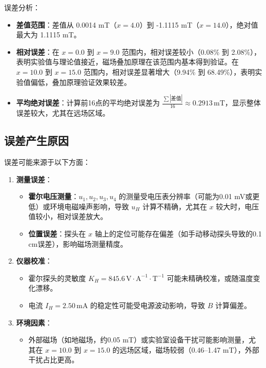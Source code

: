 \documentclass[12pt]{article}
\begin{document}
\begin{CJK}{UTF8}{gbsn}
误差分析：
\begin{itemize}
    \item \textbf{差值范围}：差值从 0.0014 mT（\( x = 4.0 \)）到 -1.1115 mT（\( x = 14.0 \)），绝对值最大为 1.1115 mT。
    \item \textbf{相对误差}：在 \( x = 0.0 \) 到 \( x = 9.0 \) 范围内，相对误差较小（0.08\% 到 2.08\%），表明实验值与理论值接近，磁场叠加原理在该范围内基本得到验证。在 \( x = 10.0 \) 到 \( x = 15.0 \) 范围内，相对误差显著增大（9.94\% 到 68.49\%），表明实验值偏低，叠加原理验证效果较差。
    \item \textbf{平均绝对误差}：计算前16点的平均绝对误差为 \( \frac{\sum |\text{差值}|}{16} \approx 0.2913 \, \text{mT} \)，显示整体误差较大，尤其在远场区域。
\end{itemize}

\subsection{误差产生原因}
误差可能来源于以下方面：
\begin{enumerate}
    \item \textbf{测量误差}：
        \begin{itemize}
            \item \textbf{霍尔电压测量}：\( u_1, u_2, u_3, u_4 \) 的测量受电压表分辨率（可能为0.01 mV或更低）或环境电磁噪声影响，导致 \( u_H \) 计算不精确，尤其在 \( x \) 较大时，电压值较小，相对误差放大。
            \item \textbf{位置误差}：探头在 \( x \) 轴上的定位可能存在偏差（如手动移动探头导致的0.1 cm误差），影响磁场测量精度。
        \end{itemize}
    \item \textbf{仪器校准}：
        \begin{itemize}
            \item 霍尔探头的灵敏度 \( K_H = 845.6 \, \text{V} \cdot \text{A}^{-1} \cdot \text{T}^{-1} \) 可能未精确校准，或随温度变化漂移。
            \item 电流 \( I_H = 2.50 \, \text{mA} \) 的稳定性可能受电源波动影响，导致 \( B \) 计算偏差。
        \end{itemize}
    \item \textbf{环境因素}：
        \begin{itemize}
            \item 外部磁场（如地磁场，约0.05 mT）或实验室设备干扰可能影响测量，尤其在 \( x = 10.0 \) 到 \( x = 15.0 \) 的远场区域，磁场较弱（0.46–1.47 mT），外部干扰占比更高。

\end{itemize}
\end{enumerate}
\end{CJK}
\end{document}
